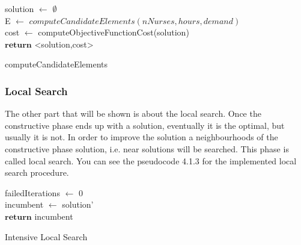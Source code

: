 \begin{algorithm}[H]


solution $\leftarrow$ $\emptyset$ \\
E $\leftarrow$ $computeCandidateElements(nNurses, hours, demand)$ \\
cost $\leftarrow$ computeObjectiveFunctionCost(solution)\\
$\textbf{return}$ <solution,cost>
\caption{computeCandidateElements}\label{alg.mainLoop}
\end{algorithm}


\subsubsection{Local Search}

The other part that will be shown is about the local search. Once the constructive phase ends up with a solution, eventually it is the optimal, but usually it is not. In order to improve the solution a neighbourhoods of the constructive phase solution, i.e. near solutions will be searched. This phase is called local search. You can see the pseudocode 4.1.3 for the implemented local search procedure.

\begin{algorithm}[H]


failedIterations $\leftarrow$ 0 \\
incumbent $\leftarrow$ solution'\\
$\textbf{return}$ incumbent
\caption{Intensive Local Search}\label{alg.mainLoop}
\end{algorithm}


